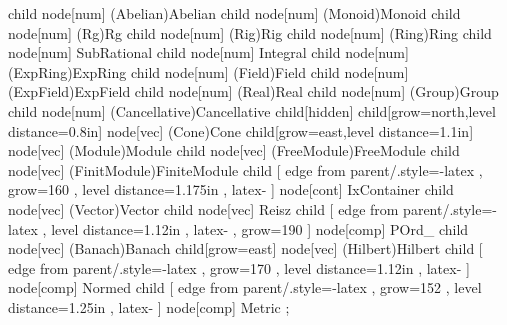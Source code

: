 

    child { node[num] (Abelian){Abelian} }
    child { node[num] (Monoid){Monoid}
        child { node[num] (Rg){Rg}
            child { node[num] (Rig){Rig}
                child { node[num] (Ring){Ring}
                    child { node[num] {SubRational}
                        child {node[num] {Integral} }
                    }
                    child { node[num] (ExpRing){ExpRing}
                    }
                    child { node[num] (Field){Field}
                        child { node[num] (ExpField){ExpField}
                            child {node[num] (Real){Real} }
                        }
                    }
                }
            }
        }
        child { node[num] (Group){Group}
        }
    }
    child { node[num] (Cancellative){Cancellative}
        child[hidden] {}
        child[grow=north,level distance=0.8in] { node[vec] (Cone){Cone}
            child[grow=east,level distance=1.1in] { node[vec] (Module){Module}
                child { node[vec] (FreeModule){FreeModule}
                    child { node[vec] (FinitModule){FiniteModule}
                        child
                            [ edge from parent/.style={-latex}
                            , grow=160
                            , level distance=1.175in
                            , latex-
                            ]
                            { node[cont] {IxContainer}
                            }
                        child { node[vec] (Vector){Vector}
                            child { node[vec] {Reisz}
                                child
                                    [ edge from parent/.style={-latex}
                                    , level distance=1.12in
                                    , latex-
                                    , grow=190
                                    ]
                                    { node[comp] {POrd\_}
                                    }
                            }
                            child { node[vec] (Banach){Banach}
                                child[grow=east] { node[vec] (Hilbert){Hilbert} }
                                child
                                    [ edge from parent/.style={-latex}
                                    , grow=170
                                    , level distance=1.12in
                                    , latex-
                                    ]
                                    { node[comp] {Normed}
                                    }
                                child
                                    [ edge from parent/.style={-latex}
                                    , grow=152
                                    , level distance=1.25in
                                    , latex-
                                    ]
                                    { node[comp] {Metric}
                                    }
                            }
                        }
                    }
                }
            }
        }
    }
    ;

